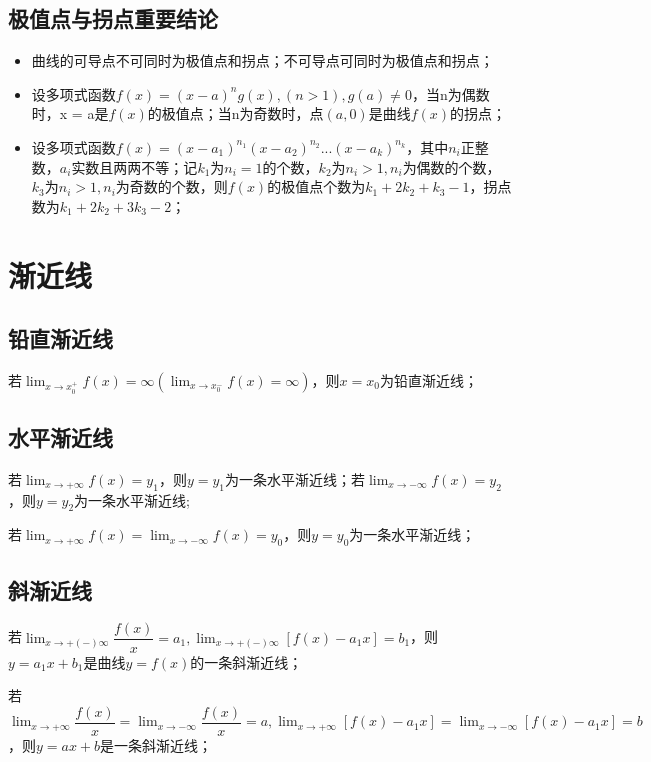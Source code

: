 \subsection{极值点与拐点重要结论}
\begin{itemize}
    \item 曲线的可导点不可同时为极值点和拐点；不可导点可同时为极值点和拐点；
    \item 设多项式函数\(f(x) = (x - a)^ng(x), (n > 1), g(a) \neq 0\)，当n为偶数时，x = a是\(f(x)\)的极值点；当n为奇数时，点\((a, 0)\)是曲线\(f(x)\)的拐点；
    \item 设多项式函数\(f(x) = (x - a_1)^{n_1}(x - a_2)^{n_2}...(x - a_k)^{n_k}\)，其中\(n_i\)正整数，\(a_i\)实数且两两不等；记\(k_1\)为\(n_i = 1\)的个数，\(k_2\)为\(n_i > 1, n_i\)为偶数的个数，\(k_3\)为\(n_i > 1, n_i\)为奇数的个数，则\(f(x)\)的极值点个数为\(k_1 + 2k_2 + k_3 - 1\)，拐点数为\(k_1 + 2k_2 + 3k_3 - 2\)；
\end{itemize}


\section{渐近线}

\subsection{铅直渐近线}
若\(\displaystyle\lim_{x \to x_0^+}f(x) = \infty(\lim_{x \to x_0^-}f(x) = \infty)\)，则\(x = x_0\)为铅直渐近线；

\subsection{水平渐近线}
若\(\displaystyle\lim_{x \to +\infty}f(x) = y_1\)，则\(y = y_1\)为一条水平渐近线；若\(\displaystyle\lim_{x \to -\infty}f(x) = y_2\)，则\(y = y_2\)为一条水平渐近线;

若\(\displaystyle\lim_{x \to +\infty}f(x) = \lim_{x \to -\infty}f(x) = y_0\)，则\(y = y_0\)为一条水平渐近线；

\subsection{斜渐近线}
若\(\displaystyle\lim_{x \to +(-)\infty}\dfrac{f(x)}{x} = a_1, \lim_{x \to +(-)\infty}[f(x) - a_1x] = b_1\)，则\(y = a_1x + b_1\)是曲线\(y = f(x)\)的一条斜渐近线；

若\(\displaystyle\lim_{x \to +\infty}\dfrac{f(x)}{x} = \lim_{x \to -\infty}\dfrac{f(x)}{x} = a, \lim_{x \to +\infty}[f(x) - a_1x] = \lim_{x \to -\infty}[f(x) - a_1x] = b\)，则\(y = ax + b\)是一条斜渐近线；

